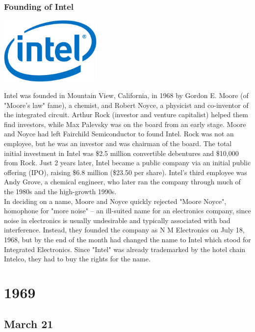 \documentclass[11pt]{report}
\begin{document}
\subsection{Founding of Intel}
\vspace{2mm}\begin{center}\includegraphics[width=5cm]{./img/intelLogo.jpg}\end{center}
Intel was founded in Mountain View, California, in 1968 by Gordon E. Moore (of "Moore's law" fame), a chemist, and Robert Noyce, a physicist and co-inventor of the integrated circuit. Arthur Rock (investor and venture capitalist) helped them find investors, while Max Palevsky was on the board from an early stage. Moore and Noyce had left Fairchild Semiconductor to found Intel. Rock was not an employee, but he was an investor and was chairman of the board. The total initial investment in Intel was \$2.5 million convertible debentures and \$10,000 from Rock. Just 2 years later, Intel became a public company via an initial public offering (IPO), raising \$6.8 million (\$23.50 per share). Intel's third employee was Andy Grove, a chemical engineer, who later ran the company through much of the 1980s and the high-growth 1990s.\\
\indent In deciding on a name, Moore and Noyce quickly rejected "Moore Noyce", homophone for "more noise" – an ill-suited name for an electronics company, since noise in electronics is usually undesirable and typically associated with bad interference. Instead, they founded the company as N M Electronics on July 18, 1968, but by the end of the month had changed the name to Intel which stood for Integrated Electronics. Since "Intel" was already trademarked by the hotel chain Intelco, they had to buy the rights for the name.

\chapter{1969}
\section{March 21}
\end{document}
